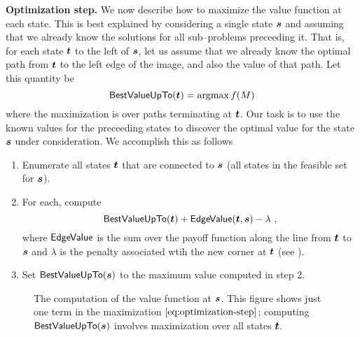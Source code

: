 \textbf{Optimization step.} We now describe how to maximize the value
function at each state. This is best explained by considering a single
state $\State$ and assuming that we already know the solutions for all
sub--problems preceeding it. That is, for each state $\OtherState$ to
the left of $\State$, let us assume that we already know the optimal
path from $\OtherState$ to the left edge of the image, and also the
value of that path. Let this quantity be
\begin{equation}
  \bestvalue(\OtherState) = \argmax \Objective(\Scene)
\end{equation}
where the maximization is over paths terminating at $\OtherState$. Our
task is to use the known values for the preceeding states to discover
the optimal value for the state $\State$ under consideration. We
accomplish this as follows
\begin{enumerate}
  \item{Enumerate all states $\OtherState$ that are connected to
    $\State$ (\ie all states in the feasible set for $\State$).}
  \item{For each, compute
    \begin{equation}
      \label{eq:optimization-step}
      \bestvalue(\OtherState)+\edgevalue(\OtherState,\State)-\lambda ~,
    \end{equation}
    where $\edgevalue$ is the sum over the payoff function along the
    line from $\OtherState$ to $\State$ and $\lambda$ is the penalty
    associated wtih the new corner at $\OtherState$ (see
    ).}
  \item{Set $\bestvalue(\State)$ to the maximum value computed in
    step 2.}
\end{enumerate}

\begin{figure}[tb]
  \centering
  \caption{The computation of the value function at $\State$. This
    figure shows just one term in the maximization
    $\eqnref{optimization-step}$; computing $\bestvalue(\State)$
    involves maximization over all states $\OtherState$.}
  \label{fig:recurrence-value}
\end{figure}

